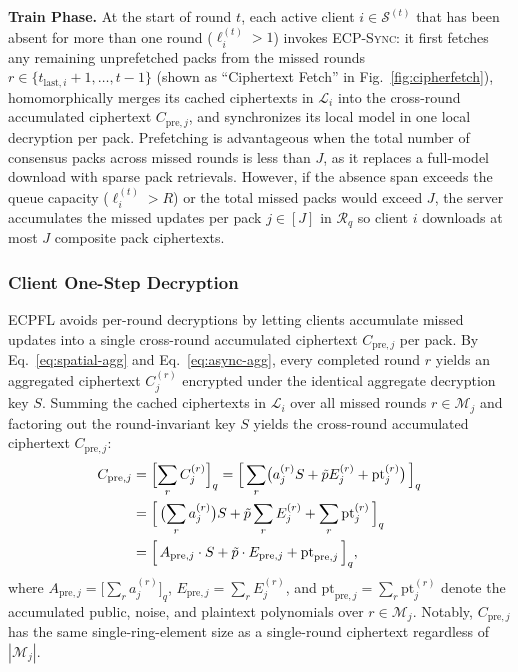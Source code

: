 \textbf{Train Phase.}
At the start of round $t$, each active client $i \in \mathcal{S}^{(t)}$ that has been absent for more than one round ($\ell_i^{(t)} > 1$) invokes \textsc{ECP-Sync}: it first fetches any remaining unprefetched packs from the missed rounds $r \in \{t_{\mathrm{last},i}+1, \dots, t-1\}$ (shown as ``Ciphertext Fetch'' in Fig.~\ref{fig:cipherfetch}), homomorphically merges its cached ciphertexts in $\mathcal{L}_i$ into the cross-round accumulated ciphertext $C_{\mathrm{pre},j}$, and synchronizes its local model in one local decryption per pack.
Prefetching is advantageous when the total number of consensus packs across missed rounds is less than $J$, as it replaces a full-model download with sparse pack retrievals.
However, if the absence span exceeds the queue capacity ($\ell_i^{(t)} > R$) or the total missed packs would exceed $J$, the server accumulates the missed updates per pack $j \in [J]$ in $\mathcal{R}_q$ so client $i$ downloads at most $J$ composite pack ciphertexts.

\subsubsection{Client One-Step Decryption}
\label{sec:prefetch-decrypt}
\textsc{ECPFL} avoids per-round decryptions by letting clients accumulate missed updates into a single cross-round accumulated ciphertext $C_{\mathrm{pre},j}$ per pack. By Eq.~\eqref{eq:spatial-agg} and Eq.~\eqref{eq:async-agg}, every completed round $r$ yields an aggregated ciphertext $C_j^{(r)}$ encrypted under the identical aggregate decryption key $S$. Summing the cached ciphertexts in $\mathcal{L}_i$ over all missed rounds $r \in \mathcal{M}_j$ and factoring out the round-invariant key $S$ yields the cross-round accumulated ciphertext $C_{\mathrm{pre},j}$:
\begin{align}
 C_{\mathrm{pre},j} &= \Bigl[\sum_{r} C_{j}^{(r)}\Bigr]_q
 = \Bigl[\, \sum_{r} \bigl( a_j^{(r)} S + \tilde{p} E_j^{(r)} + \mathrm{pt}_j^{(r)} \bigr) \,\Bigr]_q \notag \\
 &= \Bigl[\, \bigl(\sum_{r} a_j^{(r)}\bigr) S + \tilde{p} \sum_{r} E_j^{(r)} + \sum_{r} \mathrm{pt}_j^{(r)} \,\Bigr]_q \notag \\
 &= \Bigl[\, A_{\mathrm{pre},j} \cdot S + \tilde{p} \cdot E_{\mathrm{pre},j} + \mathrm{pt}_{\mathrm{pre},j} \,\Bigr]_{q},
 \label{eq:prefetch-accumulation}
\end{align}
where $A_{\mathrm{pre},j} = \bigl[\sum_{r} a_j^{(r)}\bigr]_q$, $E_{\mathrm{pre},j} = \sum_{r} E_j^{(r)}$, and $\mathrm{pt}_{\mathrm{pre},j} = \sum_{r} \mathrm{pt}_j^{(r)}$ denote the accumulated public, noise, and plaintext polynomials over $r \in \mathcal{M}_j$. Notably, $C_{\mathrm{pre},j}$ has the same single-ring-element size as a single-round ciphertext regardless of $|\mathcal{M}_j|$.

